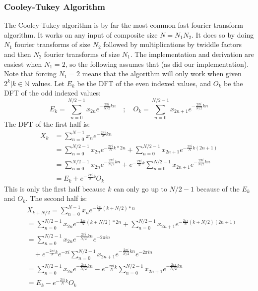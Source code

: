 	\subsubsection{Cooley-Tukey Algorithm}
		The Cooley-Tukey algorithm is by far the most common fast fourier transform algorithm. It works on any input of composite size $N=N_1N_2$. It does so by doing $N_1$ fourier transforms of size $N_2$ followed by multiplications by twiddle factors and then $N_2$ fourier transforms of size $N_1$. The implementation and derivation are easiest when $N_1=2$, so the following assumes that (as did our implementation). Note that forcing $N_1=2$ means that the algorithm will only work when given $2^k|k\in\mathbb{N}$ values. Let $E_k$ be the DFT of the even indexed values, and $O_k$ be the DFT of the odd indexed values:
		\[
			E_k = \sum_{n=0}^{N/2-1}x_{2n}e^{-\frac{2\pi i}{N/2}kn} \quad;\quad
			O_k = \sum_{n=0}^{N/2-1}x_{2n+1}e^{-\frac{2\pi i}{N/2}kn}
		\]
		The DFT of the first half is:
		\begin{align*}
			X_k &= \sum_{n=0}^{N-1}x_ne^{-\frac{2\pi i}{N}kn} \\
			&=\sum_{n=0}^{N/2-1}x_{2n}e^{-\frac{2\pi i}{N}k*2n} + \sum_{n=0}^{N/2-1}x_{2n+1}e^{-\frac{2\pi i}{N}k(2n+1)} \\
			&=\sum_{n=0}^{N/2-1}x_{2n}e^{-\frac{2\pi i}{N/2}kn} + e^{-\frac{2\pi i}{N}k}\sum_{n=0}^{N/2-1}x_{2n+1}e^{-\frac{2\pi i}{N/2}kn} \\
			&=E_k+e^{-\frac{2\pi i}{N}k}O_k
		\end{align*}
		This is only the first half because $k$ can only go up to $N/2-1$ because of the $E_k$ and $O_k$. The second half is:
		\begin{align*}
			&X_{k+N/2} = \sum_{n=0}^{N-1}x_ne^{-\frac{2\pi i}{N}(k+N/2)*n} \\
			&=\sum_{n=0}^{N/2-1}x_{2n}e^{-\frac{2\pi i}{N}(k+N/2)*2n} + \sum_{n=0}^{N/2-1}x_{2n+1}e^{-\frac{2\pi i}{N}(k+N/2)(2n+1)} \\
			&=\sum_{n=0}^{N/2-1}x_{2n}e^{-\frac{2\pi i}{N/2}kn}e^{-2\pi in} \\
			& \quad + e^{-\frac{2\pi i}{N}k}e^{-\pi i} \sum_{n=0}^{N/2-1}x_{2n+1}e^{-\frac{2\pi i}{N/2}kn}e^{-2\pi in} \\
			&=\sum_{n=0}^{N/2-1}x_{2n}e^{-\frac{2\pi i}{N/2}kn} - e^{-\frac{2\pi i}{N}k}\sum_{n=0}^{N/2-1}x_{2n+1}e^{-\frac{2\pi i}{N/2}kn} \\
			&=E_k-e^{-\frac{2\pi i}{N}k}O_k
		\end{align*}
